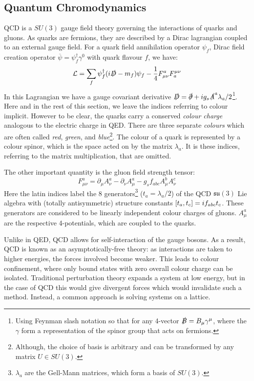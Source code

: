 \documentclass[a4paper,12pt]{article}
\begin{document}
\subsection{Quantum Chromodynamics}
QCD is a $SU(3)$ gauge field theory governing the interactions of quarks and gluons. As quarks are fermions, they are described by a Dirac lagrangian coupled to an external gauge field. For a quark field annihilation operator $\psi_f$, Dirac field creation operator $\overline{\psi}=\psi^\dagger_f\gamma^0$ with quark flavour $f$, we have\cite{2010QFT, 2015Colquhoun}:
\begin{equation}
    \label{eq:Dirac}
    \mathcal{L} = \sum_f \psi^\dagger_f (i\slashed{D}-m_f) \psi_f - \frac{1}{4}F^a_{\mu\nu} F^{\mu\nu}_a
\end{equation}
In this Lagrangian we have a gauge covariant derivative $\slashed{D} = \slashed{\partial} + i g_s \slashed{A}^a \lambda_a / 2$\footnote{Using Feynman slash notation so that for any 4-vector $\slashed{B}=B_\mu \gamma^\mu$, where the $\gamma$ form a representation of the spinor group that acts on fermions.}. Here and in the rest of this section, we leave the indices referring to colour implicit. However to be clear, the quarks carry a conserved \emph{colour charge} analogous to the electric charge in QED\@. There are three separate \emph{colours} which are often called \emph{red}, \emph{green}, and \emph{blue}\footnote{Although, the choice of basis is arbitrary and can be transformed by any matrix $U \in SU(3)$.}. The colour of a quark is represented by a colour spinor, which is the space acted on by the matrix $\lambda_a$. It is these indices, referring to the matrix multiplication, that are omitted.

The other important quantity is the gluon field strength tensor:
\begin{equation}
    \label{eq:FieldTensor}
    F^a_{\mu\nu} = \partial_\mu A_\nu^a - \partial_\nu A_\mu^a - g_s f_{abc} A_\mu^b A_\nu^c
\end{equation}
Here the latin indices label the 8 generators\footnote{$\lambda_a$ are the Gell-Mann matrices, which form a basis of $SU(3)$.} ($t_a = \lambda_a/2$) of the QCD $\mathfrak{su}(3)$ Lie algebra with (totally antisymmetric) structure constants $\comm{t_a}{t_c} = i f_{abc} t_c$. These generators are considered to be linearly independent colour charges of gluons. $A_\mu^a$ are the respective 4-potentials, which are coupled to the quarks.

Unlike in QED, QCD allows for self-interaction of the gauge bosons. As a result, QCD is known as an asymptotically-free theory: as interactions are taken to higher energies, the forces involved become weaker. This leads to colour confinement, where only bound states with zero overall colour charge can be isolated. Traditional perturbation theory expands a system at low energy, but in the case of QCD this would give divergent forces which would invalidate such a method. Instead, a common approach is solving systems on a lattice.
\end{document}
